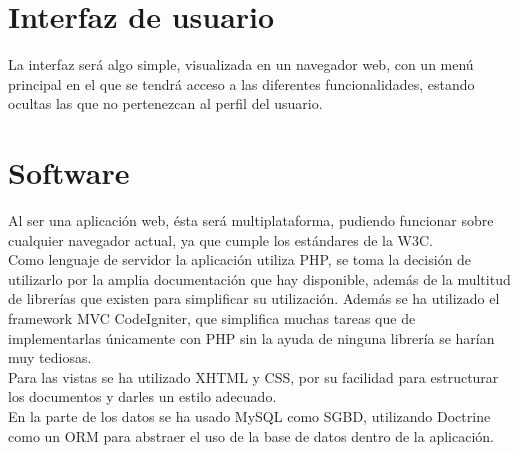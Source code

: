 \section{Interfaz de usuario}
La interfaz será algo simple, visualizada en un navegador web, con un menú principal en el que se tendrá acceso a las diferentes funcionalidades, estando ocultas las que no pertenezcan al perfil del usuario.

\section{Software}
Al ser una aplicación web, ésta será multiplataforma, pudiendo funcionar sobre cualquier navegador actual, ya que cumple los estándares de la W3C.\\

Como lenguaje de servidor la aplicación utiliza PHP, se toma la decisión de utilizarlo por la amplia documentación que hay disponible, además de la multitud de librerías que existen para simplificar su utilización. Además se ha utilizado el framework MVC CodeIgniter, que simplifica muchas tareas que de implementarlas únicamente con PHP sin la ayuda de ninguna librería se harían muy tediosas.\\

Para las vistas se ha utilizado XHTML y CSS, por su facilidad para estructurar los documentos y darles un estilo adecuado.\\

En la parte de los datos se ha usado MySQL como SGBD, utilizando Doctrine como un ORM para abstraer el uso de la base de datos dentro de la aplicación.
